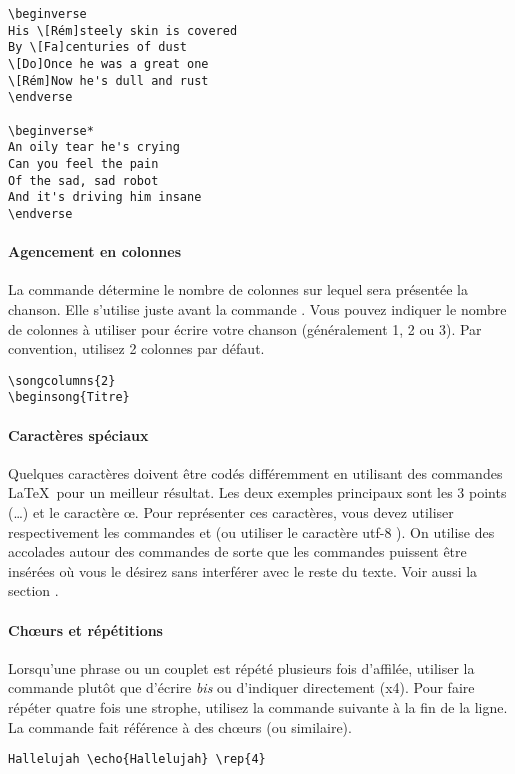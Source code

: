 \documentclass[versionenligne]{patacrep}
\begin{document}
\begin{verbatim}
\beginverse
His \[Rém]steely skin is covered
By \[Fa]centuries of dust
\[Do]Once he was a great one
\[Rém]Now he's dull and rust
\endverse

\beginverse*
An oily tear he's crying
Can you feel the pain
Of the sad, sad robot
And it's driving him insane
\endverse
\end{verbatim}

\paragraph{Agencement en colonnes}
La commande  détermine le nombre de colonnes sur
lequel sera présentée la chanson. Elle s'utilise juste avant la
commande . Vous pouvez indiquer le nombre de
colonnes à utiliser pour écrire votre chanson (généralement 1, 2 ou
3). Par convention, utilisez 2 colonnes par défaut.

\begin{verbatim}
\songcolumns{2}
\beginsong{Titre}
\end{verbatim}

\paragraph{Caractères spéciaux}
Quelques caractères doivent être codés différemment en utilisant des
commandes \LaTeX\, pour un meilleur résultat. Les deux exemples
principaux sont les 3 points (\dots) et le caractère \oe{}. Pour
représenter ces caractères, vous devez utiliser respectivement les
commandes  et  (ou utiliser le
caractère utf-8 ). On utilise des accolades autour des
commandes de sorte que les commandes puissent être insérées où vous le
désirez sans interférer avec le reste du texte. Voir aussi la section
.

\paragraph{Ch\oe{}urs et répétitions}
Lorsqu'une phrase ou un couplet est répété plusieurs fois d'affilée,
utiliser la commande  plutôt que d'écrire \emph{bis} ou
d'indiquer directement (x4). Pour faire répéter quatre fois une
strophe, utilisez la commande suivante à la fin de la ligne. La
commande  fait référence à des chœurs (ou similaire).

\begin{verbatim}
Hallelujah \echo{Hallelujah} \rep{4}
\end{verbatim}
\end{document}
